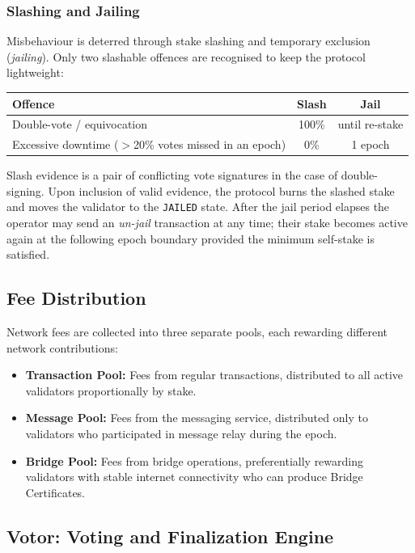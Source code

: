 \documentclass{article}
\begin{document}
\subsubsection{Slashing and Jailing}
\label{sec:slashing}

Misbehaviour is deterred through stake slashing and temporary exclusion (\emph{jailing}).  Only two slashable offences are recognised to keep the protocol lightweight:

\begin{center}
\begin{tabular}{l c c}
\textbf{Offence} & \textbf{Slash} & \textbf{Jail}\;\\\hline
Double-vote / equivocation & 100\% & until re-stake \\
Excessive downtime ($>$20\% votes missed in an epoch) & 0\% & 1 epoch \\
\end{tabular}
\end{center}

Slash evidence is a pair of conflicting vote signatures in the case of double-signing. Upon inclusion of valid evidence, the protocol burns the slashed stake and moves the validator to the \texttt{JAILED} state.  After the jail period elapses the operator may send an \emph{un-jail} transaction at any time; their stake becomes active again at the following epoch boundary provided the minimum self-stake is satisfied.

\subsection{Fee Distribution}
\label{sec:fees}

Network fees are collected into three separate pools, each rewarding different network contributions:
\begin{itemize}
    \item \textbf{Transaction Pool:} Fees from regular transactions, distributed to all active validators proportionally by stake.
    \item \textbf{Message Pool:} Fees from the messaging service, distributed only to validators who participated in message relay during the epoch.
    \item \textbf{Bridge Pool:} Fees from bridge operations, preferentially rewarding validators with stable internet connectivity who can produce Bridge Certificates.
\end{itemize}

\subsection{Votor: Voting and Finalization Engine}
\end{document}
